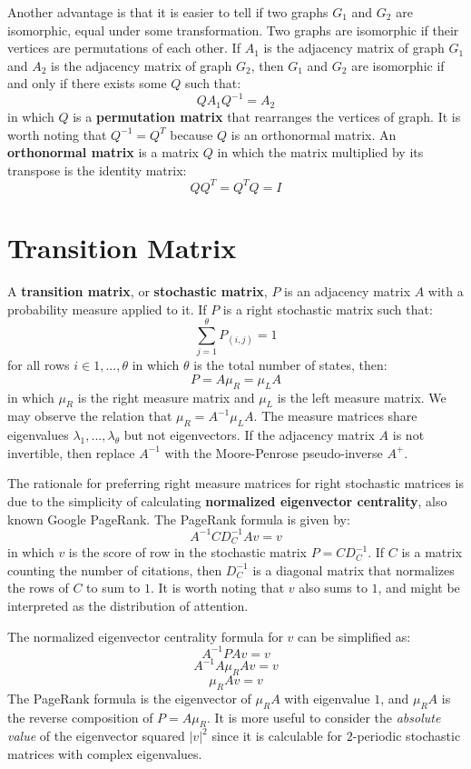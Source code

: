 \documentclass[10pt, a5paper, twoside, openright]{memoir}
\begin{document}
Another advantage is that it is easier to tell if two graphs $G_1$ and $G_2$ are isomorphic, equal under some transformation. Two graphs are isomorphic if their vertices are permutations of each other. If $A_1$ is the adjacency matrix of graph $G_1$ and $A_2$ is the adjacency matrix of graph $G_2$, then $G_1$ and $G_2$ are isomorphic if and only if there exists some $Q$ such that:
$$Q A_1 Q^{-1} = A_2$$
in which $Q$ is a \textbf{permutation matrix} that rearranges the vertices of graph. It is worth noting that $Q^{-1} = Q^T$ because $Q$ is an orthonormal matrix. An \textbf{orthonormal matrix} is a matrix $Q$ in which the matrix multiplied by its transpose is the identity matrix: 
$$Q Q^T= Q^T Q = I$$

\section{Transition Matrix}
A \textbf{transition matrix}, or \textbf{stochastic matrix}, $P$ is an adjacency matrix $A$ with a probability measure applied to it. If $P$ is a right stochastic matrix such that:
$$\sum\limits_{j=1}^\theta P_{(i, j)} = 1$$
for all rows $i \in 1,...,\theta$ in which $\theta$ is the total number of states, then:
$$P = A \mu_R = \mu_L A$$
in which $\mu_R$ is the right measure matrix and $\mu_L$ is the left measure matrix. We may observe the relation that $\mu_R = A^{-1}\mu_L A$. The measure matrices share eigenvalues $\lambda_1,...,\lambda_\theta$ but not eigenvectors. If the adjacency matrix $A$ is not invertible, then replace $A^{-1}$ with the Moore-Penrose pseudo-inverse $A^+$.

The rationale for preferring right measure matrices for right stochastic matrices is due to the simplicity of calculating \textbf{normalized eigenvector centrality}, also known Google PageRank. The PageRank formula is given by:
$$A^{-1} C D_C^{-1} A v = v$$
in which $v$ is the score of row in the stochastic matrix $P = C D_C^{-1}$. If $C$ is a matrix counting the number of citations, then $D_C^{-1}$ is a diagonal matrix that normalizes the rows of $C$ to sum to $1$. It is worth noting that $v$ also sums to $1$, and might be interpreted as the distribution of attention.

The normalized eigenvector centrality formula for $v$ can be simplified as:
$$A^{-1} P A v = v $$
$$A^{-1} A \mu_R A v = v$$
$$\mu_R A v = v$$
The PageRank formula is the eigenvector of $\mu_R A$ with eigenvalue $1$, and $\mu_R A$ is the reverse composition of $P = A \mu_R$. It is more useful to consider the \textit{absolute value} of the eigenvector squared $|v|^2$ since it is calculable for $2$-periodic stochastic matrices with complex eigenvalues.
\end{document}
